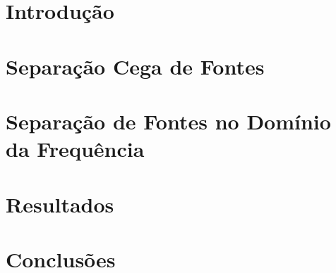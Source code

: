 \documentclass[a4paper,12pt,oneside,openany]{book}
\begin{document}
\frontmatter
\thispagestyle{empty}



\pagebreak            



\tableofcontents
\listoffigures
\listoftables

\mainmatter
\cleardoublepage
\chapter{Introdução}
\label{cap1}


\chapter{Separação Cega de Fontes}
\label{cap2}


\chapter{Separação de Fontes no Domínio da Frequência}
\label{cap3}


\chapter{Resultados}
\label{cap4}


\chapter{Conclusões}
\label{cap5}



\normalsize
\cleardoublepage
{}



\backmatter
\end{document}
